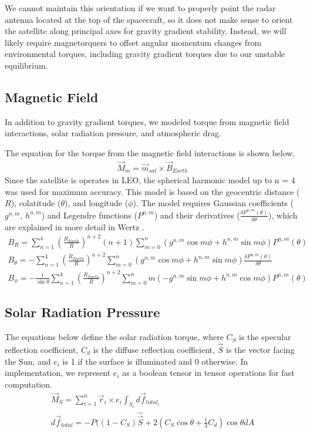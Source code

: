 We cannot maintain this orientation if we want to properly point the radar antenna located at the top of the spacecraft, so it does not make sense to orient the satellite along principal axes for gravity gradient stability. Instead, we will likely require magnetorquers to offset angular momentum changes from environmental torques, including gravity gradient torques due to our unstable equilibrium.

\subsection{Magnetic Field}
In addition to gravity gradient torques, we modeled torque from magnetic field interactions, solar radiation pressure, and atmospheric drag.

The equation for the torque from the magnetic field interactions is shown below.
\begin{align*}
    \Vec{M}_{m} = \Vec{m}_{sat} \times \Vec{B}_{Earth}
\end{align*}
Since the satellite is operates in LEO, the spherical harmonic model up to n = 4 was used for maximum accuracy. This model is based on the geocentric distance ($R$), colatitude ($\theta$), and longitude ($\phi$). The model requires Gaussian coefficients ($g^{n,m}$, $h^{n,m}$) and Legendre functions ($P^{n,m}$) and their derivatives ($\frac{\delta P^{n,m} (\theta)}{\delta \theta}$), which are explained in more detail in Wertz \cite{Wertz}.
\begin{align*}
    B_R = \sum^{4}_{n=1} (\frac{R_{Earth}}{R})^{n+2} (n+1) \sum^{n}_{m=0}
    (g^{n,m} \cos{m \phi} + h^{n,m} \sin{m \phi}) P^{n,m}(\theta) \\
    B_{\theta} = - \sum^{4}_{n=1} (\frac{R_{Earth}}{R})^{n+2} \sum^{n}_{m=0}
    (g^{n,m} \cos{m \phi} + h^{n,m} \sin{m \phi}) \frac{\delta P^{n,m} (\theta)}{\delta \theta} \\
    B_{\phi} = - \frac{1}{\sin{\theta}} \sum^{4}_{n=1} (\frac{R_{Earth}}{R})^{n+2}
    \sum^{n}_{m=0} m (-g^{n,m} \sin{m \phi} + h^{n,m} \cos{m \phi}) P^{n,m}(\theta)
\end{align*}

\subsection{Solar Radiation Pressure}
The equations below define the solar radiation torque, where $C_S$ is the specular reflection coefficient, $C_d$ is the diffuse reflection coefficient, $\Vec{S}$ is the vector facing the Sun, and $e_i$ is 1 if the surface is illuminated and 0 otherwise. In implementation, we represent $e_i$ as a boolean tensor in tensor operations for fast computation.
\begin{align*}
    \Vec{M}_{S} = \sum^{n}_{i=1} \Vec{r}_{i} \times e_i \int_{S_i} d \Vec{f}_{total_{i}} \\
    d \Vec{f}_{total} = -P ((1-C_S) \hat{\Vec{S}} + 2 (C_S \cos{\theta} + \frac{1}{3} C_d) \cos{\theta} dA
\end{align*}

